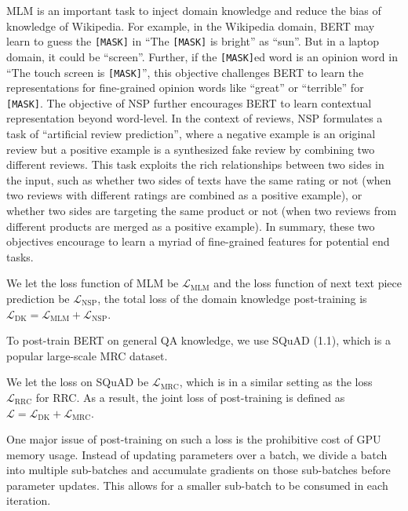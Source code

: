 MLM is an important task to inject domain knowledge and reduce the bias of knowledge of Wikipedia. 
For example, in the Wikipedia domain, BERT may learn to guess the \texttt{[MASK]} in ``The \texttt{[MASK]} is bright'' as ``sun''. But in a laptop domain, it could be ``screen''.
Further, if the \texttt{[MASK]}ed word is an opinion word in ``The touch screen is \texttt{[MASK]}'', this objective challenges BERT to learn the representations for fine-grained opinion words like ``great'' or ``terrible'' for \texttt{[MASK]}.
The objective of NSP further encourages BERT to learn contextual representation beyond word-level.
In the context of reviews, NSP formulates a task of ``artificial review prediction'', where a negative example is an original review but a positive example is a synthesized fake review by combining two different reviews.
This task exploits the rich relationships between two sides in the input, such as whether two sides of texts have the same rating or not (when two reviews with different ratings are combined as a positive example), or whether two sides are targeting the same product or not (when two reviews from different products are merged as a positive example).
In summary, these two objectives encourage to learn a myriad of fine-grained features for potential end tasks. 

We let the loss function of MLM be $\mathcal{L}_{\text{MLM}}$ and the loss function of next text piece prediction be $\mathcal{L}_{\text{NSP}}$, the total loss of the domain knowledge post-training is $\mathcal{L}_{\text{DK}}=\mathcal{L}_{\text{MLM}} + \mathcal{L}_{\text{NSP}} $.

To post-train BERT on general QA knowledge, we use SQuAD (1.1), which is a popular large-scale MRC dataset.

We let the loss on SQuAD be $\mathcal{L}_{\text{MRC}}$, which is in a similar setting as the loss $\mathcal{L}_{\text{RRC}}$ for RRC.
As a result, the joint loss of post-training is defined as $\mathcal{L}=\mathcal{L}_{\text{DK}} + \mathcal{L}_{\text{MRC}}$.

One major issue of post-training on such a loss is the prohibitive cost of GPU memory usage.
Instead of updating parameters over a batch, we divide a batch into multiple sub-batches and accumulate gradients on those sub-batches before parameter updates. This allows for a smaller sub-batch to be consumed in each iteration.


